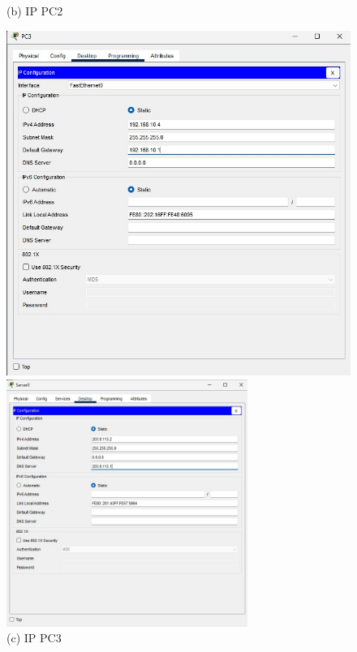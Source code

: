 \begin{enumerate}
\begin{figure}[H]
\begin{minipage}{0.32\textwidth}
            \caption*{(b) IP PC2}
        \end{minipage}\hfill
        \begin{minipage}{0.32\textwidth}
            \centering
            \includegraphics[width=\textwidth]{img4/IPCPC3.jpeg}
            \caption*{(c) IP PC3}
        \end{minipage}
        \vspace{1em}
        \begin{minipage}{0.48\textwidth}
            \centering
            \includegraphics[width=0.7\textwidth]{img4/IPCServer.jpeg}

\end{minipage}
\end{figure}
\end{enumerate}
